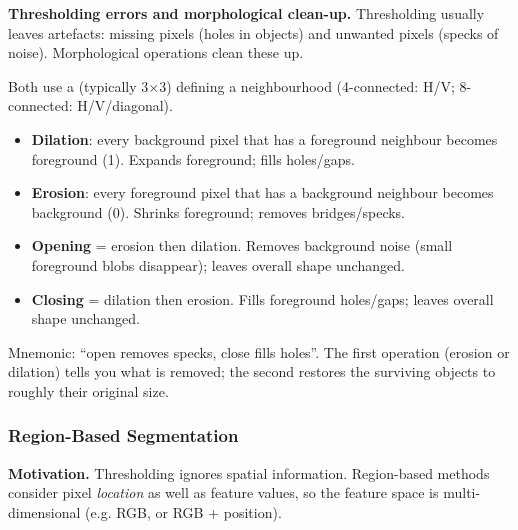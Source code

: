 \separator

\textbf{Thresholding errors and morphological clean-up.}
Thresholding usually leaves artefacts: missing pixels (holes in objects) and unwanted pixels (specks of noise). Morphological operations clean these up.

\begin{defbox}
Both use a  (typically 3$\times$3) defining a neighbourhood (4-connected: H/V; 8-connected: H/V/diagonal).
\begin{itemize}
  \item \textbf{Dilation}: every background pixel that has a foreground neighbour becomes foreground (1). Expands foreground; fills holes/gaps.
  \item \textbf{Erosion}: every foreground pixel that has a background neighbour becomes background (0). Shrinks foreground; removes bridges/specks.
\end{itemize}
\end{defbox}

\begin{thmbox}
\begin{itemize}
  \item \textbf{Opening} = erosion then dilation. Removes background noise (small foreground blobs disappear); leaves overall shape unchanged.
  \item \textbf{Closing} = dilation then erosion. Fills foreground holes/gaps; leaves overall shape unchanged.
\end{itemize}
\end{thmbox}

\begin{tipbox}
Mnemonic: ``open removes specks, close fills holes''. The first operation (erosion or dilation) tells you what is removed; the second restores the surviving objects to roughly their original size.
\end{tipbox}

\bigseparator

\subsubsection{Region-Based Segmentation}

\textbf{Motivation.} Thresholding ignores spatial information. Region-based methods consider pixel \emph{location} as well as feature values, so the feature space is multi-dimensional (e.g. RGB, or RGB + position).

